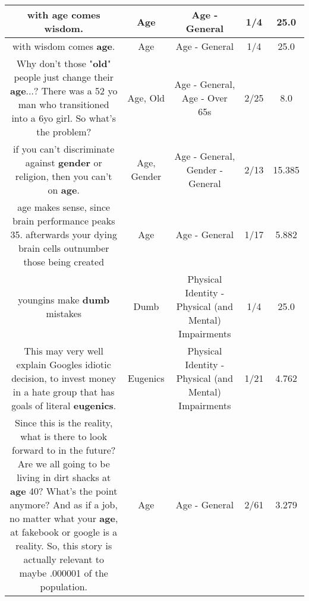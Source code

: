 \documentclass[11pt]{article}
\newlength\mylength
\begin{document}
\begin{center}
\begin{longtable}{|C{.65\mylength}|C{.30\mylength}|C{.12\mylength}|C{.12\mylength}|C{.12\mylength}|}
  \small with \textbf{age} comes wisdom.\normalsize   & Age & Age - General & 1/4 & 25.0 \\  \hline
  \small with wisdom comes \textbf{age}.\normalsize   & Age & Age - General & 1/4 & 25.0 \\  \hline
  \small Why don't those "\textbf{old}" people just change their \textbf{age}...? There was a 52 yo man who transitioned into a 6yo girl. So what's the problem?\normalsize   & Age, Old & Age - General, Age - Over 65s & 2/25 & 8.0 \\  \hline
  \small if you can't discriminate against \textbf{gender} or religion, then you can't on \textbf{age}.\normalsize   & Age, Gender & Age - General, Gender - General & 2/13 & 15.385 \\  \hline
  \small age makes sense, since brain performance peaks \@35. afterwards your dying brain cells outnumber those being created\normalsize   & Age & Age - General & 1/17 & 5.882 \\  \hline
  \small youngins make \textbf{dumb} mistakes\normalsize   & Dumb & Physical Identity - Physical (and Mental) Impairments & 1/4 & 25.0 \\  \hline
  \small This may very well explain Googles idiotic decision, to invest money in a hate group that has goals of literal \textbf{eugenics}.\normalsize   & Eugenics & Physical Identity - Physical (and Mental) Impairments & 1/21 & 4.762 \\  \hline
  \small Since this is the reality, what is there to look forward to in the future? Are we all going to be living in dirt shacks at \textbf{age} 40? What's the point anymore? And as if a job, no matter what your \textbf{age}, at fakebook or google is a reality. So, this story is actually relevant to maybe .000001 of the population.\normalsize   & Age & Age - General & 2/61 & 3.279 \\  \hline

\end{longtable}
\end{center}
\end{document}
